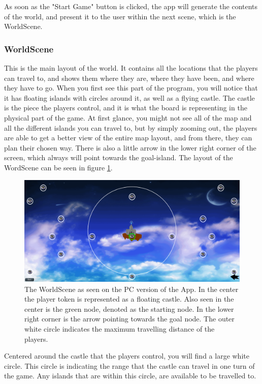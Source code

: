 As soon as the "Start Game" button is clicked, the app will generate the contents of the world, and present it to the user within the next scene, which is the WorldScene.

\subsubsection{WorldScene}
This is the main layout of the world. It contains all the locations that the players can travel to, and shows them where they are, where they have been, and where they have to go.
When you first see this part of the program, you will notice that it has floating islands with circles around it, as well as a flying castle. The castle is the piece the players control, and it is what the board is representing in the physical part of the game.
At first glance, you might not see all of the map and all the different islands you can travel to, but by simply zooming out, the players are able to get a better view of the entire map layout, and from there, they can plan their chosen way. There is also a little arrow in the lower right corner of the screen, which always will point towards the goal-island. 
The layout of the WordScene can be seen in figure \ref{fig:worldSc}.

\begin{figure}[h]
    \centering
    \includegraphics[scale=0.3]{Images/WorldScene.png}
    \caption{The WorldScene as seen on the PC version of the App. In the center the player token is represented as a floating castle. Also seen in the center is the green node, denoted as the starting node. In the lower right corner is the arrow pointing towards the goal node. The outer white circle indicates the maximum travelling distance of the players.}
    \label{fig:worldSc}
\end{figure}

Centered around the castle that the players control, you will find a large white circle. This circle is indicating the range that the castle can travel in one turn of the game. Any islands that are within this circle, are available to be travelled to.

